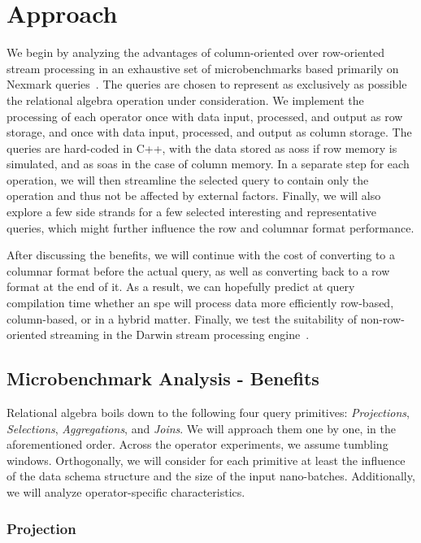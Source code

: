 \section{Approach}
\label{sec:approach}

We begin by analyzing the advantages of column-oriented over row-oriented stream processing in an exhaustive set of microbenchmarks based primarily on Nexmark queries~\cite{tucker2008nexmark}.
The queries are chosen to represent as exclusively as possible the relational algebra operation under consideration.
We implement the processing of each operator once with data input, processed, and output as row storage, and once with data input, processed, and output as column storage.
The queries are hard-coded in C++, with the data stored as \acp{aos} if row memory is simulated, and as \acp{soa} in the case of column memory.
In a separate step for each operation, we will then streamline the selected query to contain only the operation and thus not be affected by external factors.
Finally, we will also explore a few side strands for a few selected interesting and representative queries, which might further influence the row and columnar format performance.

After discussing the benefits, we will continue with the cost of converting to a columnar format before the actual query, as well as converting back to a row format at the end of it.
As a  result, we can hopefully predict at query compilation time whether an \ac{spe} will process data more efficiently row-based, column-based, or in a hybrid matter.
Finally, we test the suitability of non-row-oriented streaming in the Darwin stream processing engine~\cite[]{DBLP:conf/cidr/BensonR22}.

\subsection{Microbenchmark Analysis - Benefits}
Relational algebra boils down to the following four query primitives: \emph{Projections}, \emph{Selections}, \emph{Aggregations}, and \emph{Joins}.
We will approach them one by one, in the aforementioned order.
Across the operator experiments, we assume tumbling windows.
Orthogonally, we will consider for each primitive at least the influence of the data schema structure and the size of the input nano-batches.
Additionally, we will analyze operator-specific characteristics.

\subsubsection{Projection}

